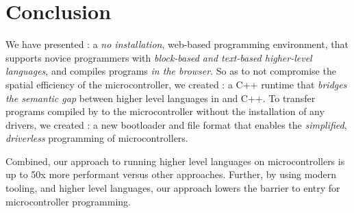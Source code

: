\section{Conclusion}
\label{sec:conclude}

We have presented \MCN: a \emph{no installation}, web-based programming environment, that supports novice programmers with \emph{block-based and text-based higher-level languages}, and compiles programs \emph{in the browser}. So as to not compromise the spatial efficiency of the microcontroller, we created \CON: a C++ runtime that \emph{bridges the semantic gap} between higher level languages in \MC and C++. To transfer programs compiled by \MC to the microcontroller without the installation of any drivers, we created \UFN: a new bootloader and file format that enables the \emph{simplified}, \emph{driverless} programming of microcontrollers.

Combined, our approach to running higher level languages on microcontrollers is up to 50x more performant versus other approaches. Further, by using modern tooling, and higher level languages, our approach lowers the barrier to entry for microcontroller programming.


